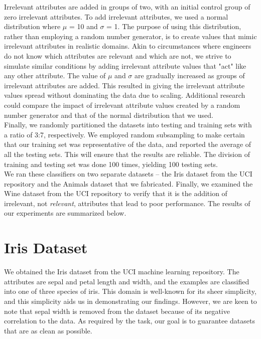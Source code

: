 \documentclass{article}
\begin{document}
Irrelevant attributes are added in groups of two, with an initial control group of zero irrelevant attributes. To add irrelevant attributes, we used a normal distribution where $\mu$ = 10 and $\sigma$ = 1. The purpose of using this distribution, rather than employing a random number generator, is to create values that mimic irrelevant attributes in realistic domains. Akin to circumstances where engineers do not know which attributes are relevant and which are not, we strive to simulate similar conditions by adding irrelevant attribute values that "act" like any other attribute. The value of $\mu$ and $\sigma$ are gradually increased as groups of irrelevant attributes are added. This resulted in giving the irrelevant attribute values spread without dominating the data due to scaling. Additional research could compare the impact of irrelevant attribute values created by a random number generator and that of the normal distribution that we used.  \\

Finally, we randomly partitioned the datasets into testing and training sets with a ratio of 3:7, respectively. We employed random subsampling to make certain that our training set was representative of the data, and reported the average of all the testing sets. This will ensure that the results are reliable. The division of training and testing set was done 100 times, yielding 100 testing sets. \\   

We ran these classifiers on two separate datasets -- the Iris dataset from the UCI repository and the Animals dataset that we fabricated. Finally, we examined the Wine dataset from the UCI repository to verify that it is the addition of irrelevant, not \textit{relevant}, attributes that lead to poor performance.  The results of our experiments are summarized below.

\section{Iris Dataset}

We obtained the Iris dataset from the UCI machine learning repository. The attributes are sepal and petal length and width, and the examples are classified into one of three species of iris. This domain is well-known for its sheer simplicity, and this simplicity aids us in demonstrating our findings. However, we are keen to note that sepal width is removed from the dataset because of its negative correlation to the data. As required by the task, our goal is to guarantee datasets that are as clean as possible. \\ 
\end{document}
